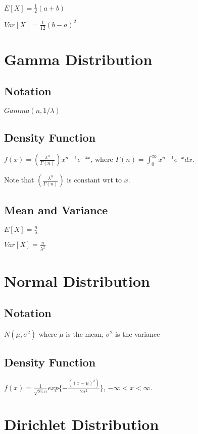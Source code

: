 \documentclass{article}
\begin{document}
\begin{multicols*}{2}
$E[X] = \frac{1}{2}(a + b)$

$Var[X] = \frac{1}{12}(b - a)^2$

\section{Gamma Distribution}
\label{sec:gamma-distribution}

\subsection{Notation}

$Gamma(n, 1 / \lambda)$

\subsection{Density Function}

$f(x) = (\frac{\lambda^{n}}{\Gamma(n)}) x^{n-1} e^{-\lambda x}$, where $\Gamma(n) = \int^{\infty}_{0} x^{n-1}e^{- x} dx$.

Note that $(\frac{\lambda^{n}}{\Gamma(n)})$ is constant wrt to $x$.

\subsection{Mean and Variance}

$E[X] = \frac{n}{\lambda}$

$Var[X] = \frac{n}{\lambda^{2}}$

\section{Normal Distribution}
\label{sec:normal-dist}

\subsection{Notation}

$N(\mu,\sigma^2)$ where $\mu$ is the mean, $\sigma^{2}$ is the variance

\subsection{Density Function}

$f(x) = \frac{1}{\sqrt{2\pi}\sigma}exp\{- \frac{((x - \mu)^2)}{2\sigma^2}\}$,
$- \infty < x < \infty$.

\section{Dirichlet Distribution}
\label{sec:dirichlet-dist}


\end{multicols*}
\end{document}
